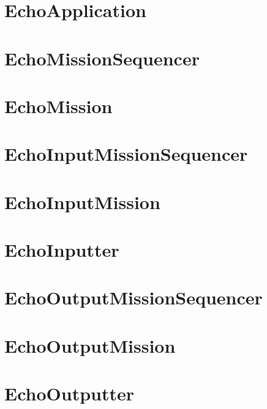 \documentclass[10pt,a4paper,final]{article}
\begin{document}
\section{EchoApplication}

\pagebreak

\section{EchoMissionSequencer}

\pagebreak

\section{EchoMission}

\pagebreak

\section{EchoInputMissionSequencer}

\pagebreak

\section{EchoInputMission}

\pagebreak

\section{EchoInputter}

\pagebreak


\section{EchoOutputMissionSequencer}

\pagebreak

\section{EchoOutputMission}

\pagebreak

\section{EchoOutputter}

\pagebreak
\end{document}
